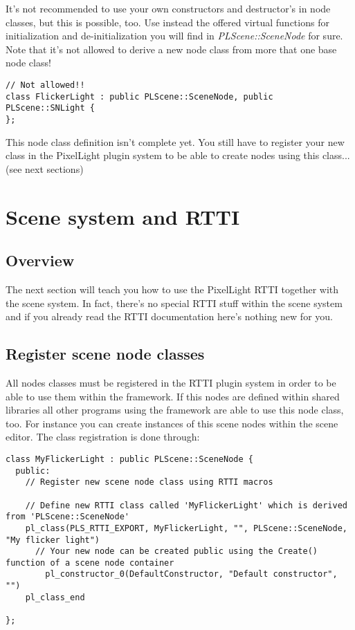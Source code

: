 It's not recommended to use your own constructors and destructor's in node classes, but this is possible, too. Use instead the offered virtual functions for initialization and de-initialization you will find in \emph{PLScene::SceneNode} for sure. Note that it's not allowed to derive a new node class from more that one base node class!

\begin{lstlisting}[caption=Invalid scene node class creating]
// Not allowed!!
class FlickerLight : public PLScene::SceneNode, public PLScene::SNLight {
};
\end{lstlisting}

This node class definition isn't complete yet. You still have to register your new class in the PixelLight plugin system to be able to create nodes using this class... (see next sections)




\section{Scene system and RTTI}


\subsection{Overview}
The next section will teach you how to use the PixelLight RTTI together with the scene system. In fact, there's no special RTTI stuff within the scene system and if you already read the RTTI documentation here's nothing new for you.


\subsection{Register scene node classes}
All nodes classes must be registered in the RTTI plugin system in order to be able to use them within the framework. If this nodes are defined within shared libraries all other programs using the framework are able to use this node class, too. For instance you can create instances of this scene nodes within the scene editor. The class registration is done through:

\begin{lstlisting}[caption=RTTI and own new scene node class]
class MyFlickerLight : public PLScene::SceneNode { 
  public:
    // Register new scene node class using RTTI macros

    // Define new RTTI class called 'MyFlickerLight' which is derived from 'PLScene::SceneNode'
	pl_class(PLS_RTTI_EXPORT, MyFlickerLight, "", PLScene::SceneNode, "My flicker light")
      // Your new node can be created public using the Create() function of a scene node container
		pl_constructor_0(DefaultConstructor, "Default constructor", "")
	pl_class_end

};
\end{lstlisting}

